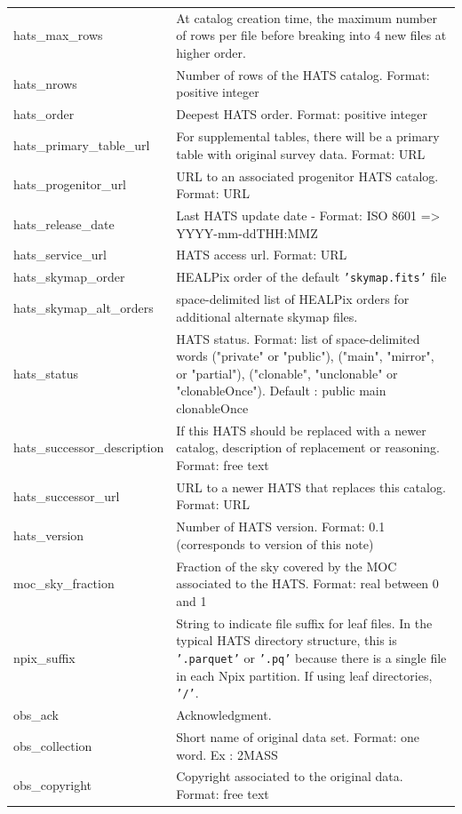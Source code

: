 \documentclass[11pt,a4paper]{ivoa}
\begin{document}
{\begin{longtable}[h!]{p{} p{}}
hats\_max\_rows &At catalog creation time, the maximum number of rows per file before breaking into 4 new files at higher order. \\
hats\_nrows &Number of rows of the HATS catalog. Format: positive integer \\
hats\_order &Deepest HATS order. Format: positive integer \\
hats\_primary\_table\_url &For supplemental tables, there will be a primary table with original survey data. Format: URL\\
hats\_progenitor\_url &URL to an associated progenitor HATS catalog. Format: URL \\
hats\_release\_date &Last HATS update date - Format: ISO 8601 => YYYY-mm-ddTHH:MMZ \\
hats\_service\_url &HATS access url. Format: URL \\
hats\_skymap\_order &HEALPix order of the default \texttt{'skymap.fits'} file \\
hats\_skymap\_alt\_orders &space-delimited list of HEALPix orders for additional alternate skymap files. \\
hats\_status &HATS status. Format: list of space-delimited words ("private" or "public"), ("main", "mirror", or "partial"), ("clonable", "unclonable" or "clonableOnce"). Default : public main clonableOnce \\
hats\_successor\_description &If this HATS should be replaced with a newer catalog, description of replacement or reasoning. Format: free text \\
hats\_successor\_url &URL to a newer HATS that replaces this catalog. Format: URL \\
hats\_version &Number of HATS version. Format: 0.1 (corresponds to version of this note) \\
moc\_sky\_fraction &Fraction of the sky covered by the MOC associated to the HATS. Format: real between 0 and 1 \\
npix\_suffix & String to indicate file suffix for leaf files. In the typical HATS directory structure, this is \texttt{'.parquet'} or \texttt{'.pq'} because there is a single file in each Npix partition. If using leaf directories, \texttt{'/'}. \\
obs\_ack &Acknowledgment. \\
obs\_collection &Short name of original data set. Format: one word. Ex : 2MASS \\
obs\_copyright &Copyright associated to the original data. Format: free text \\

\end{longtable}}
\end{document}
